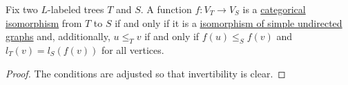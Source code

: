 \begin{proposition}\label{thm:labeled_tree_isomorphisms}
  Fix two \( L \)-labeled trees \( T \) and \( S \). A function \( f: V_T \to V_S \) is a \hyperref[def:morphism_invertibility/isomorphism]{categorical isomorphism} from \( T \) to \( S \) if and only if it is a \hyperref[thm:graph_isomorphisms/simple_undirected]{isomorphism of simple undirected graphs} and, additionally, \( u \leq_T v \) if and only if \( f(u) \leq_S f(v) \) and \( l_T(v) = l_S(f(v)) \) for all vertices.
\end{proposition}
\begin{proof}
  The conditions are adjusted so that invertibility is clear.
\end{proof}
